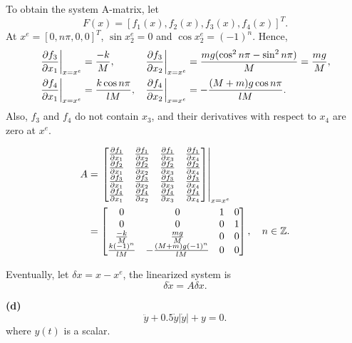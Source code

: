 \documentclass[12pt,a4paper]{article}
\begin{document}
To obtain the system A-matrix, let
\[
F(x)=[f_1(x),f_2(x),f_3(x),f_4(x)]^T.
\]
At $x^e=[0,n\pi,0,0]^T$, $\sin x_2^e=0$ and $\cos x_2^e=(-1)^n$.
Hence,
\[
\begin{aligned}
\left.{\partial f_3\over\partial x_1}\right|_{x=x^e}
&= {-k\over M}, &
\left.{\partial f_3\over\partial x_2}\right|_{x=x^e}
&= {mg(\cos^2 n\pi-\sin^2 n\pi)\over M}={mg\over M}, \\
\left.{\partial f_4\over\partial x_1}\right|_{x=x^e}
&= {k\cos n\pi\over lM}, &
\left.{\partial f_4\over\partial x_2}\right|_{x=x^e}
&= -{(M+m)g\cos n\pi\over lM}.
\end{aligned}
\]
Also, $f_3$ and $f_4$ do not contain $x_3$, and their derivatives
with respect to $x_4$ are zero at $x^e$.

\begin{align*}
	A &= \left.\begin{bmatrix}
		{\partial f_1 \over\partial x_1 } & {\partial f_1 \over\partial x_2 } & {\partial f_1 \over\partial x_3 } & {\partial f_1 \over\partial x_4 }  \\
		{\partial f_2 \over\partial x_1 } & {\partial f_2 \over\partial x_2 }  & {\partial f_2 \over\partial x_3 }  & {\partial f_2 \over\partial x_4 } \\
		{\partial f_3 \over\partial x_1 } & {\partial f_3 \over\partial x_2 } & {\partial f_3 \over\partial x_3 } & {\partial f_3 \over\partial x_4 } \\
		{\partial f_4 \over\partial x_1 } &{\partial f_4 \over\partial x_2 } &{\partial f_4 \over\partial x_3 } &{\partial f_4 \over\partial x_4 }  \\
	\end{bmatrix}\right|_{x=x^e} \\
	&= \begin{bmatrix}
		0 & 0 & 1 & 0 \\
		0 & 0 & 0 & 1 \\
		{-k\over M} & {mg\over M} & 0 & 0 \\
		{k(-1)^n\over lM} & -{(M+m)g(-1)^n\over lM} & 0 & 0
	\end{bmatrix},\quad n\in\mathbb Z.
\end{align*}

Eventually, let $\delta x=x-x^e$, the linearized system is
\[
\delta\dot x=A\delta x.
\]

\par\vspace{1.5cm}

\textbf{(d)}
\[\ddot y+0.5\dot y|\dot y|+y=0.\]
where $y(t)$ is a scalar.
\end{document}
